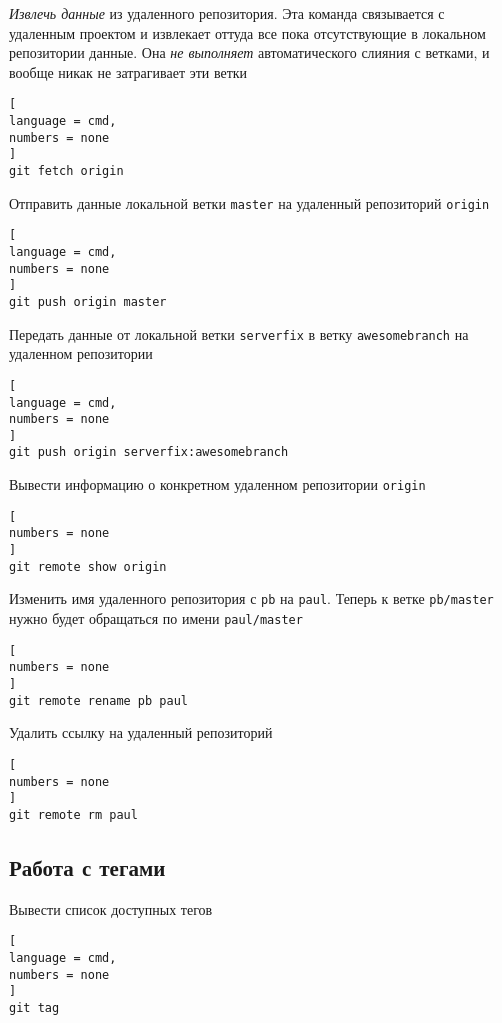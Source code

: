 \documentclass[%
	11pt,
	a4paper,
	utf8,
		]{article}
\begin{document}
\emph{Извлечь данные} из удаленного репозитория. Эта команда связывается с удаленным проектом и извлекает оттуда все пока отсутствующие в локальном репозитории данные. Она \emph{\color{red}не выполняет} автоматического слияния с ветками, и вообще никак не затрагивает эти ветки

\begin{lstlisting}[
language = cmd,
numbers = none
]
git fetch origin
\end{lstlisting}


Отправить данные локальной ветки \texttt{master} на удаленный репозиторий \texttt{origin}

\begin{lstlisting}[
language = cmd,
numbers = none
]
git push origin master
\end{lstlisting}


Передать данные от локальной ветки \texttt{serverfix} в ветку \texttt{awesomebranch} на удаленном репозитории

\begin{lstlisting}[
language = cmd,
numbers = none
]
git push origin serverfix:awesomebranch
\end{lstlisting}

Вывести информацию о конкретном удаленном репозитории \texttt{origin}

\begin{lstlisting}[
numbers = none
]
git remote show origin
\end{lstlisting}


Изменить имя удаленного репозитория с \texttt{pb} на \texttt{paul}. Теперь к ветке \texttt{pb/master} нужно будет обращаться по имени \texttt{paul/master}

\begin{lstlisting}[
numbers = none
]
git remote rename pb paul
\end{lstlisting}


Удалить ссылку на удаленный репозиторий

\begin{lstlisting}[
numbers = none
]
git remote rm paul
\end{lstlisting}


\subsection{Работа с тегами}

Вывести список доступных тегов

\begin{lstlisting}[
language = cmd,
numbers = none
]
git tag
\end{lstlisting}
\end{document}
